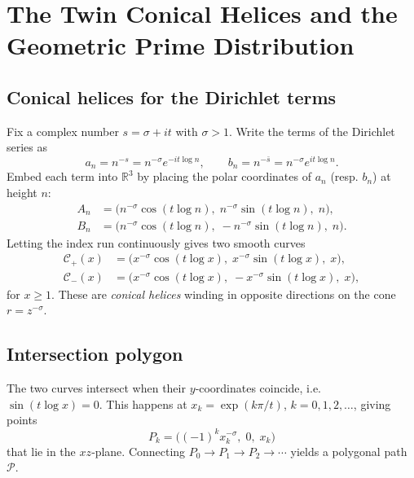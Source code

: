 \documentclass[12pt,a4paper]{article}
\newcommand{\R}{\mathbb{R}}
\begin{document}
\section{The Twin Conical Helices and the Geometric Prime Distribution}

\subsection{Conical helices for the Dirichlet terms}
Fix a complex number $s = \sigma + i t$ with $\sigma > 1$.  Write the terms of the Dirichlet series as
\[
a_n = n^{-s} = n^{-\sigma} e^{-i t \log n}, \qquad
b_n = n^{-\bar s} = n^{-\sigma} e^{i t \log n}.
\]
Embed each term into $\R^3$ by placing the polar coordinates of $a_n$ (resp. $b_n$) at height $n$:
\begin{align*}
A_n &= \bigl( n^{-\sigma} \cos(t\log n),\; n^{-\sigma} \sin(t\log n),\; n \bigr),\\
B_n &= \bigl( n^{-\sigma} \cos(t\log n),\; -n^{-\sigma} \sin(t\log n),\; n \bigr).
\end{align*}
Letting the index run continuously gives two smooth curves
\begin{align}
\mathcal{C}_+(x) &= \bigl( x^{-\sigma} \cos(t\log x),\; x^{-\sigma} \sin(t\log x),\; x \bigr),\\
\mathcal{C}_-(x) &= \bigl( x^{-\sigma} \cos(t\log x),\; -x^{-\sigma} \sin(t\log x),\; x \bigr),
\end{align}
for $x \ge 1$.  These are \emph{conical helices} winding in opposite directions on the cone $r = z^{-\sigma}$.

\subsection{Intersection polygon}
The two curves intersect when their $y$‑coordinates coincide, i.e.\ $\sin(t\log x)=0$.  This happens at $x_k = \exp(k\pi/t)$, $k=0,1,2,\dots$, giving points
\[
P_k = \bigl( (-1)^k x_k^{-\sigma},\; 0,\; x_k \bigr)
\]
that lie in the $xz$‑plane.  Connecting $P_0 \to P_1 \to P_2 \to \cdots$ yields a polygonal path $\mathcal{P}$.
\end{document}
